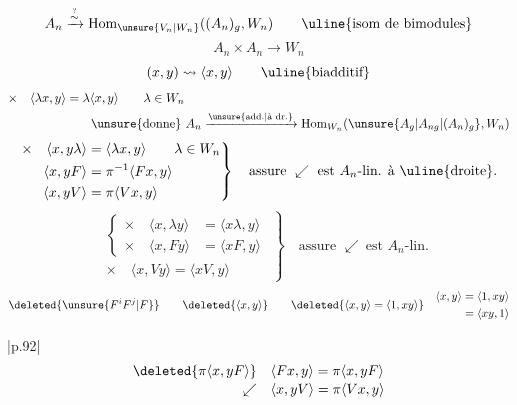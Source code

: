 \[
A_n\xrightarrow{\overset{?}{\sim}}\operatorname{Hom}_{\unsure{V_n|W_n}}((A_n)_g,W_n)
\qquad\text{\uline{isom de bimodules}}
\]
\[
\boxed{A_n\times A_n\longrightarrow W_n}
\]
\[
(x,y)\leadsto\langle x,y\rangle\qquad\text{\uline{biadditif}}
\]
\[
\begin{aligned}
\times\quad\langle\lambda x,y\rangle&=\lambda\langle x,y\rangle \qquad \lambda\in W_n\\
&\qquad\text{\unsure{donne} } A_n\xrightarrow{\text{\unsure{add.|à dr.}}}\operatorname{Hom}_{W_n}(\unsure{A_g|A_{ng}|(A_n)_g},W_n)
\end{aligned}
\]
\[
\left.\begin{aligned}
\times\quad\langle x,y\lambda\rangle&=\langle\lambda x,y\rangle\qquad\lambda\in W_n\\
\langle x,yF\rangle&=\pi^{-1}\langle Fx,y\rangle\\
\langle x,yV\rangle&=\pi\langle Vx,y\rangle
\end{aligned}\right\}\quad\text{assure }\swarrow\ \text{est }A_n\text{-lin. à \uline{droite}.}
\]
\[
\left.\begin{aligned}
&\left\{\begin{aligned}
\times\quad\langle x,\lambda y\rangle&=\langle x\lambda,y\rangle\\
\times\quad\langle x,Fy\rangle&=\langle xF,y\rangle
\end{aligned}\right.\\
&\times\quad\langle x,Vy\rangle=\langle xV,y\rangle
\end{aligned}\right\}\quad\text{assure }\swarrow\ \text{est }A_n\text{-lin.}
\]
\[
\deleted{\unsure{F^i F^j|F}}\qquad\deleted{\langle x,y\rangle}\qquad
\deleted{\langle x,y\rangle=\langle1,xy\rangle}\quad
\begin{aligned}\langle x,y\rangle&=\langle1,xy\rangle\\&=\langle xy,1\rangle\end{aligned}
\]

\noindent\begin{tabular}{|p{.92\linewidth}|}\hline
{}
\[
\begin{aligned}
\deleted{\pi\langle x,yF\rangle}&\quad\langle Fx,y\rangle=\pi\langle x,yF\rangle\\[-2pt]
\swarrow&\quad\langle x,yV\rangle=\pi\langle Vx,y\rangle
\end{aligned}
\]
\tabularnewline
\end{tabular}

